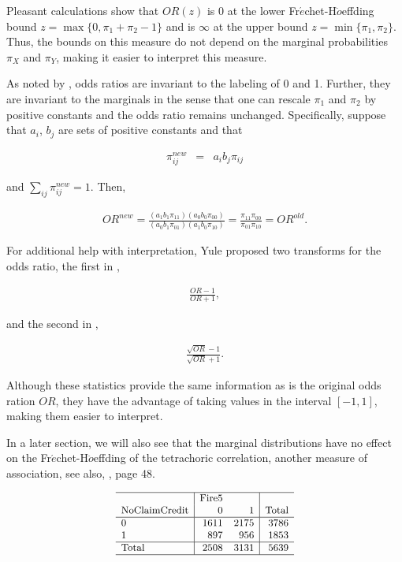 \documentclass[]{book}
\theoremstyle{definition}
\theoremstyle{definition}
\theoremstyle{definition}
\theoremstyle{remark}
\begin{document}
Pleasant calculations show that \(OR(z)\) is \(0\) at the lower
Fr\(\acute{e}\)chet-H\(\ddot{o}\)effding bound
\(z= \max\{0, \pi_1+\pi_2-1\}\) and is \(\infty\) at the upper bound
\(z=\min\{\pi_1,\pi_2\}\). Thus, the bounds on this measure do not
depend on the marginal probabilities \(\pi_X\) and \(\pi_Y\), making it
easier to interpret this measure.

As noted by \citep{yule1900association}, odds ratios are invariant to
the labeling of 0 and 1. Further, they are invariant to the marginals in
the sense that one can rescale \(\pi_1\) and \(\pi_2\) by positive
constants and the odds ratio remains unchanged. Specifically, suppose
that \(a_i\), \(b_j\) are sets of positive constants and that

\begin{eqnarray*}
\pi_{ij}^{new} &=& a_i b_j \pi_{ij}
\end{eqnarray*}

and \(\sum_{ij} \pi_{ij}^{new}=1.\) Then,

\begin{eqnarray*}
OR^{new} = \frac{(a_1 b_1 \pi_{11})( a_0 b_0 \pi_{00})}{(a_0 b_1 \pi_{01})( a_1 b_0\pi_{10})}
= \frac{\pi_{11} \pi_{00}}{\pi_{01} \pi_{10}} =OR^{old} .
\end{eqnarray*}

For additional help with interpretation, Yule proposed two transforms
for the odds ratio, the first in \citep{yule1900association},

\begin{eqnarray*}
\frac{OR-1}{OR+1},
\end{eqnarray*}

and the second in \citep{yule1912methods},

\begin{eqnarray*}
\frac{\sqrt{OR}-1}{\sqrt{OR}+1}.
\end{eqnarray*}

Although these statistics provide the same information as is the
original odds ration \(OR\), they have the advantage of taking values in
the interval \([-1,1]\), making them easier to interpret.

In a later section, we will also see that the marginal distributions
have no effect on the Fr\(\acute{e}\)chet-H\(\ddot{o}\)effding of the
tetrachoric correlation, another measure of association, see also,
\citep{joe2014dependence}, page 48.

\[
{\small \begin{matrix}
\begin{array}{l|rr|r} 
    \hline
                  & \text{Fire5} & & \\
\text{NoClaimCredit} & 0     & 1     & \text{Total} \\
  \hline
           0  & 1611  & 2175  & 3786 \\
           1  & 897   & 956   & 1853 \\
    \hline
    \text{Total}    & 2508  & 3131  & 5639 \\
   \hline
\end{array}
\end{matrix}}
\]
\end{document}
